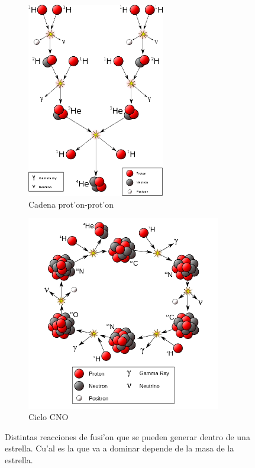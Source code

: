 \documentclass{article}
\begin{document}
\begin{enumerate}[a)]

\begin{figure}
\centering
  \begin{subfigure}{6cm}
    \centering\includegraphics[width=6cm]{p-p.png}
    \caption{Cadena prot'on-prot'on}
  \end{subfigure}
  \begin{subfigure}{6cm}
    \centering\includegraphics[width=8.5cm]{cno.png}
    \caption{Ciclo CNO}
  \end{subfigure}
  \caption{Distintas reacciones de fusi'on que se pueden generar dentro de una estrella. Cu'al es la que va a dominar depende de la masa de la estrella.}
\end{figure} 
\vspace{3mm}


\end{enumerate}
\end{document}
